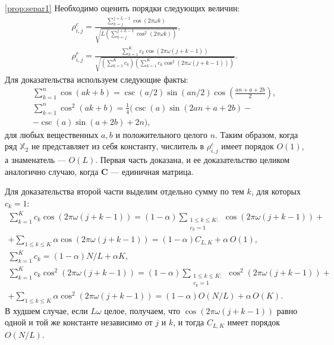 \documentclass[12pt,a4paper,fleqn,leqno]{article}
\newcommand{\tsX}{\mathbb{X}}
\newcommand{\bfC}{\mathbf{C}}
\begin{document}
\begin{proof5}{\ref{prop:separ1}}
Необходимо оценить порядки следующих величин:
\begin{gather*}
\rho^c_{i,j} = \frac{\sum_{k=j}^{j + L - 1} \cos(2 \pi \omega k)}{\sqrt{L (\sum_{k=j}^{j + L - 1} \cos^2(2 \pi \omega k))}},\\ \rho^r_{i,j} = \frac{\sum_{k=1}^K c_k\cos(2 \pi \omega (j + k - 1))}{\sqrt{(\sum_{k=1}^K c_k) (\sum_{k=1}^K c_k\cos^2(2 \pi \omega (j + k - 1)))}}.
\end{gather*}
Для доказательства используем следующие факты:
\begin{gather*}
\sum_{k=1}^n \cos(ak + b) = \csc(a/2) \sin(an / 2) \cos \left(\frac{an + a + 2b}{2} \right), \\
\sum_{k=1}^n \cos^2(ak + b) = \frac{1}{4}(\csc(a) \sin(2an + a + 2b) -\\ - \csc(a)\sin(a + 2b) + 2n),
\end{gather*}
для любых вещественных $a, b$ и положительного целого $n$.
Таким образом, когда ряд $\tsX_2$ не представляет из себя константу, числитель в $\rho^c_{i,j}$ имеет порядок $O(1)$, а знаменатель --- $O(L)$.
Первая часть доказана, и ее доказательство целиком аналогично случаю, когда $\bfC$ --- единичная матрица.

Для доказательства второй части выделим отдельно сумму по тем $k$, для которых $c_k=1$:
\begin{gather*}
\sum_{k=1}^K c_k\cos(2 \pi \omega (j + k - 1)) = (1-\alpha) \sum_{\substack{1 \le k \le K: \\ c_k = 1}}\cos(2 \pi \omega (j + k - 1)) +\\ +\sum_{1 \le k \le K}\alpha \cos(2 \pi \omega (j + k - 1)) = (1-\alpha) C_{L,K} + \alpha\, O(1),
\\
\sum_{k=1}^K c_k = (1-\alpha) N/L + \alpha K,
\\
\sum_{k=1}^K c_k\cos^2(2 \pi \omega (j + k - 1)) = (1-\alpha)\sum_{\substack{1 \le k \le K: \\ c_k = 1}}\cos^2(2 \pi \omega (j + k - 1)) +\\ +\sum_{1 \le k \le K }\alpha \cos^2(2 \pi \omega (j + k - 1)) = (1-\alpha) O(N/L) + \alpha\, O(K).
\end{gather*}
В худшем случае, если $L\omega$ целое, получаем, что $\cos(2 \pi \omega (j + k - 1))$ равно одной и той же константе независимо от $j$ и $k$, и тогда $C_{L,K}$ имеет порядок $O(N/L)$.
\end{proof5}
\end{document}
